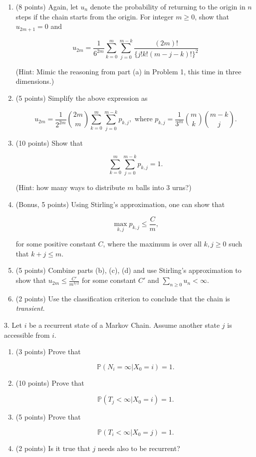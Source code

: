 \documentclass{article}
\begin{document}
\begin{enumerate}[label=(\alph*)]
    \item (8 points) Again, let $u_n$ denote the probability of returning to the origin in $n$ steps if the chain starts from the origin. For integer $m \geq 0$, show that $u_{2m+1} = 0$ and

\[
u_{2m} = \frac{1}{6^{2m}} \sum_{k=0}^{m} \sum_{j=0}^{m-k} \frac{(2m)!}{\{j! k! (m-j-k)!\}^2}
\]

(Hint: Mimic the reasoning from part (a) in Problem 1, this time in three dimensions.)

\item (5 points) Simplify the above expression as

$$u_{2m} = \frac{1}{2^{2m}} \binom{2m}{m} \sum_{k=0}^{m} \sum_{j=0}^{m-k} p_{k,j}, 
\text{ where }
p_{k,j} = \frac{1}{3^m} \binom{m}{k} \binom{m-k}{j}.
$$

\item (10 points) Show that

\[
\sum_{k=0}^{m} \sum_{j=0}^{m-k} p_{k,j} = 1.
\]

(Hint: how many ways to distribute $m$ balls into 3 urns?)

\item (Bonus, 5 points) Using Stirling’s approximation, one can show that

\[
\max_{k,j} p_{k,j} \leq \frac{C}{m},
\]

for some positive constant $C$, where the maximum is over all $k,j \geq 0$ such that $k+j \leq m$.

\item (5 points) Combine parts (b), (c), (d) and use Stirling’s approximation to show that 
$u_{2m} \leq \frac{C'}{m^{3/2}}$
for some constant $C'$ and $\sum_{n \geq 0} u_n < \infty$.

\item (2 points) Use the classification criterion to conclude that the chain is \textit{transient}.
\end{enumerate}

3. Let $i$ be a recurrent state of a Markov Chain. Assume another state $j$ is accessible from $i$.

\begin{enumerate}[label=(\alph*)]
    \item (3 points) Prove that 

\[
\mathbb{P}(N_i = \infty | X_0 = i) = 1.
\]

\item (10 points) Prove that 

\[
\mathbb{P}(T_j < \infty | X_0 = i) = 1.
\]

\item (5 points) Prove that 

\[
\mathbb{P}(T_i < \infty | X_0 = j) = 1.
\]

\item (2 points) Is it true that $j$ needs also to be recurrent?
\end{enumerate}
\end{document}

